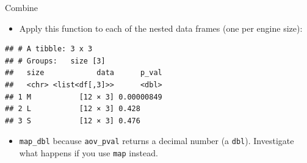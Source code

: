 \documentclass[ignorenonframetext,]{beamer}
\newenvironment{Shaded}{\begin{snugshade}}{\end{snugshade}}
\newcommand{\DataTypeTok}[1]{\textcolor[rgb]{0.13,0.29,0.53}{#1}}
\newcommand{\KeywordTok}[1]{\textcolor[rgb]{0.13,0.29,0.53}{\textbf{#1}}}
\newcommand{\NormalTok}[1]{#1}
\newcommand{\OperatorTok}[1]{\textcolor[rgb]{0.81,0.36,0.00}{\textbf{#1}}}
\newcommand{\StringTok}[1]{\textcolor[rgb]{0.31,0.60,0.02}{#1}}
\providecommand{\tightlist}{%
  \setlength{\itemsep}{0pt}\setlength{\parskip}{0pt}}
\begin{document}
\begin{frame}[fragile]{Combine}
\protect\hypertarget{combine}{}

\begin{itemize}
\tightlist
\item
  Apply this function to each of the nested data frames (one per engine
  size):
\end{itemize}

\begin{Shaded}
\end{Shaded}

\begin{verbatim}
## # A tibble: 3 x 3
## # Groups:   size [3]
##   size            data      p_val
##   <chr> <list<df[,3]>>      <dbl>
## 1 M           [12 × 3] 0.00000849
## 2 L           [12 × 3] 0.428     
## 3 S           [12 × 3] 0.476
\end{verbatim}

\begin{itemize}
\tightlist
\item
  \texttt{map\_dbl} because \texttt{aov\_pval} returns a decimal number
  (a \texttt{dbl}). Investigate what happens if you use \texttt{map}
  instead.
\end{itemize}

\end{frame}
\end{document}
